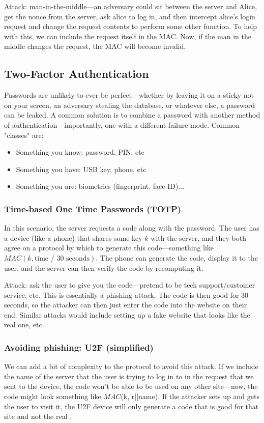 Attack: man-in-the-middle---an adversary could sit between the server and Alice, get the nonce from the server, ask alice to log in, and then intercept alice's login request and change the request contents to perform some other function. To help with this, we can include the request itself in the MAC. Now, if the man in the middle changes the request, the MAC will become invalid.

\subsection{Two-Factor Authentication}
Passwords are unlikely to ever be perfect---whether by leaving it on a sticky not on your screen, an adversary stealing the database, or whatever else, a password can be leaked. A common solution is to combine a password with another method of authentication---importantly, one with a different failure mode. Common "classes" are:

\begin{itemize}
	\item Something you know: password, PIN, etc
	\item Something you have: USB key, phone, etc
	\item Something you are: biometrics (fingerprint, face ID)...
\end{itemize}

\subsubsection{Time-based One Time Passwords (TOTP)}
In this scenario, the server requests a code along with the password. The user has a device (like a phone) that shares some key $k$ with the server, and they both agree on a protocol by which to generate this code---something like $MAC(k, \text{time / 30 seconds})$. The phone can generate the code, display it to the user, and the server can then verify the code by recomputing it.

Attack: ask the user to give you the code---pretend to be tech support/customer service, etc. This is essentially a phishing attack. The code is then good for 30 seconds, so the attacker can then just enter the code into the website on their end. Similar attacks would include setting up a fake website that looks like the real one, etc.

\subsubsection{Avoiding phishing: U2F (simplified)}
We can add a bit of complexity to the protocol to avoid this attack. If we include the name of the server that the user is trying to log in to in the request that we sent to the device, the code won't be able to be used on any other site---now, the code might look something like $MAC$(k, r||name). If the attacker sets up  and gets the user to visit it, the U2F device will only generate a code that is good for that site and not the real . 
	
